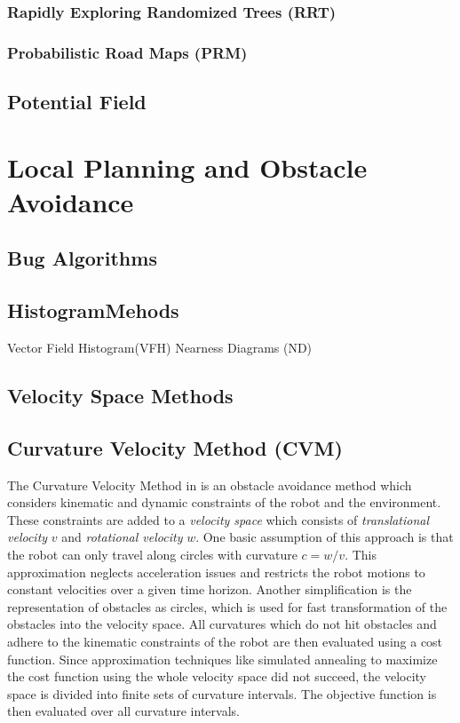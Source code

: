 \subsubsection{Rapidly Exploring Randomized Trees (RRT)}
\subsubsection{Probabilistic Road Maps (PRM)}
\subsection{Potential Field}
\section{Local Planning and Obstacle Avoidance}\label{sec:local}
\subsection{Bug Algorithms}
\subsection{HistogramMehods}
Vector Field Histogram(VFH)
Nearness Diagrams (ND)
\subsection{Velocity Space Methods}
\subsection{Curvature Velocity Method (CVM)}
The Curvature Velocity Method in \cite{simmons1996curvature} is an obstacle avoidance method which considers kinematic and dynamic constraints of the robot and the environment.
These constraints are added to a \emph{velocity space} which consists of \emph{translational velocity} $v$ and \emph{rotational velocity} $w$.
One basic assumption of this approach is that the robot can only travel along circles with curvature $c=w/v$. 
This approximation neglects acceleration issues and restricts the robot motions to constant velocities over a given time horizon.   
Another simplification is the representation of obstacles as circles, which is used for fast transformation of the obstacles into the velocity space.
All curvatures which do not hit obstacles and adhere to the kinematic constraints of the robot are then evaluated using a cost function.
Since approximation techniques like simulated annealing to maximize the cost function using the whole velocity space did not succeed, the velocity space is divided into finite sets of curvature intervals.
The objective function is then evaluated over all curvature intervals.

